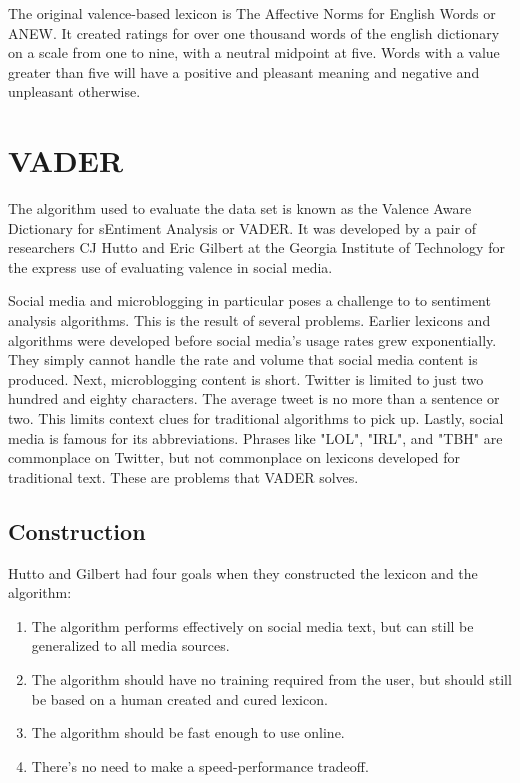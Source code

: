 \documentclass[11pt, twoside, reqno]{book}
\begin{document}
The original valence-based lexicon is The Affective Norms for English Words or ANEW. It created ratings for over one thousand words of the english dictionary on a scale from one to nine, with a neutral midpoint at five. Words with a value greater than five will have a positive and pleasant meaning and negative and unpleasant otherwise. 

\section{VADER}
\hspace{0.2in}The algorithm used to evaluate the data set is known as the Valence Aware Dictionary for sEntiment Analysis or VADER. It was developed by a pair of researchers CJ Hutto and Eric Gilbert at the Georgia Institute of Technology for the express use of evaluating valence in social media. 

Social media and microblogging in particular poses a challenge to to sentiment analysis algorithms. This is the result of several problems. Earlier lexicons and algorithms were developed before social media's usage rates grew exponentially. They simply cannot handle the rate and volume that social media content is produced. Next, microblogging content is short. Twitter is limited to just two hundred and eighty characters. The average tweet is no more than a sentence or two. This limits context clues for traditional algorithms to pick up. Lastly, social media is famous for its abbreviations. Phrases like "LOL", "IRL", and "TBH" are commonplace on Twitter, but not commonplace on lexicons developed for traditional text. These are problems that VADER solves.

\subsection{Construction}
\hspace{0.2in}Hutto and Gilbert had four goals when they constructed the lexicon and the algorithm:
\begin{enumerate}
	\item The algorithm performs effectively on social media text, but can still be generalized to all media sources. 
	\item The algorithm should have no training required from the user, but should still be based on a human created and cured lexicon. 
	\item The algorithm should be fast enough to use online.
	\item There's no need to make a speed-performance tradeoff. 
\end{enumerate}
\end{document}
